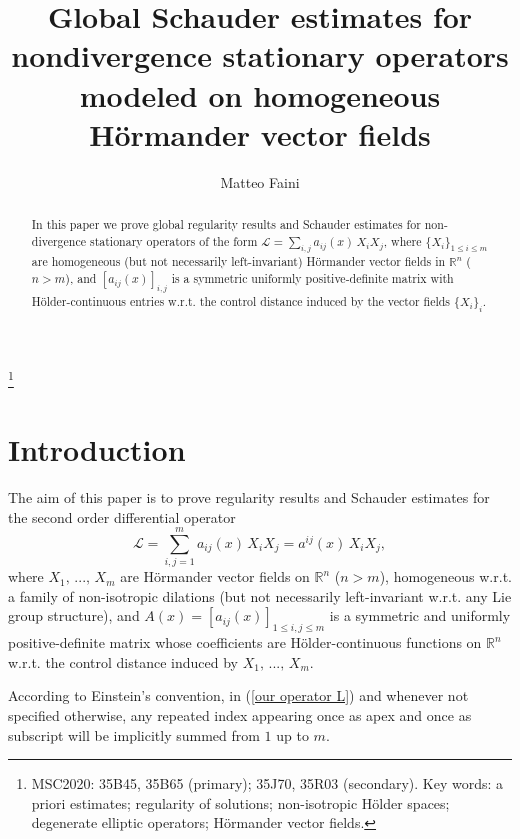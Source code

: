 \documentclass{article}
\title{Global Schauder estimates for nondivergence stationary operators modeled on homogeneous Hörmander vector fields}
\author{Matteo Faini}
\date{\begin{footnotesize} Dipartimento di Matematica, Politecnico di Milano, via Bonardi 9, 20133 Milano, Italy \end{footnotesize}}
\numberwithin{equation}{section}
\begin{document}
\maketitle

\begin{abstract}
In this paper we prove global regularity results and Schauder estimates for non-divergence stationary operators of the form $\mathcal{L}=\sum_{i,j} a_{ij}(x) \, X_i X_j$, where $\{X_i\}_{1 \leq i \leq m}$ are homogeneous (but not necessarily left-invariant) Hörmander vector fields in $\mathbb{R}^n$ ($n>m$), and $[a_{ij}(x)]_{i,j}$ is a symmetric uniformly positive-definite matrix with Hölder-continuous entries w.r.t. the control distance induced by the vector fields $\{X_i\}_i$. 
\end{abstract}

\footnote{MSC2020: 35B45, 35B65 (primary); 35J70, 35R03 (secondary).
\newline
Key words: a priori estimates; regularity of solutions; non-isotropic Hölder spaces; degenerate elliptic operators; Hörmander vector fields.}

\vspace{5mm}

\section{Introduction}
The aim of this paper is to prove regularity results and Schauder estimates for the second order differential operator
\begin{equation}
\label{our operator L}
    \mathcal{L} = \sum_{i,j=1}^m a_{ij}(x) \, X_i X_j = a^{ij}(x) \, X_i X_j,
\end{equation}
where $X_1, \, ..., \, X_m$ are Hörmander vector fields on $\mathbb{R}^n$ ($n>m$), homogeneous w.r.t. a family of non-isotropic dilations (but not necessarily left-invariant w.r.t. any Lie group structure), and $A(x)=[a_{ij}(x)]_{1 \leq i,j \leq m}$ is a symmetric and uniformly positive-definite matrix whose coefficients are Hölder-continuous functions on $\mathbb{R}^n$ w.r.t. the control distance induced by $X_1, \, ..., \, X_m$. 

According to Einstein's convention, in (\ref{our operator L}) and whenever not specified otherwise, any repeated index appearing once as apex and once as subscript will be implicitly summed from $1$ up to $m$.

\vspace{2mm}
\end{document}
